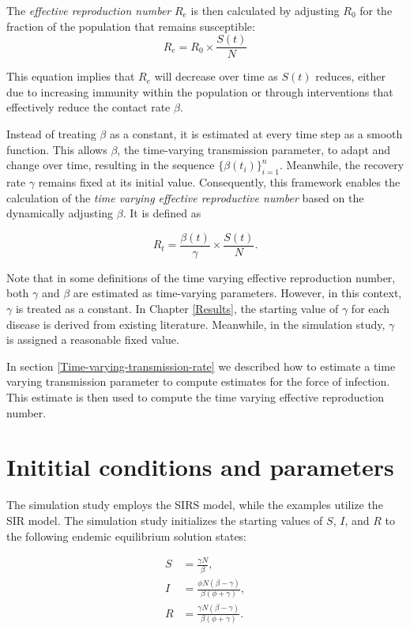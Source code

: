 \documentclass[
11pt, %
oneside, %
english, %
singlespacing, %
]{macthesis} %
\begin{document}
The \emph{effective reproduction number} \(R_e\) is then calculated by adjusting \(R_0\) for the fraction of the population that remains susceptible:
\[
R_e = R_0 \times \frac{S(t)}{N}
\]

This equation implies that \(R_e\) will decrease over time as \(S(t)\) reduces, either due to increasing immunity within the population or through interventions that effectively reduce the contact rate \(\beta\).

Instead of treating \(\beta\) as a constant, it is estimated at every time step as a smooth function. This allows \(\beta\), the time-varying transmission parameter, to adapt and change over time, resulting in the sequence \(\{\beta(t_i)\}_{i=1}^n\). Meanwhile, the recovery rate \(\gamma\) remains fixed at its initial value. Consequently, this framework enables the calculation of the \emph{time varying effective reproductive number} based on the dynamically adjusting \(\beta\). It is defined as

\[
     R_t = \frac{\beta(t)}{\gamma} \times \frac{S(t)}{N}.
 \]

Note that in some definitions of the time varying effective reproduction number, both \(\gamma\) and \(\beta\) are estimated as time-varying parameters. However, in this context, \(\gamma\) is treated as a constant. In Chapter \ref{Results}, the starting value of \(\gamma\) for each disease is derived from existing literature. Meanwhile, in the simulation study, \(\gamma\) is assigned a reasonable fixed value.

In section \ref{Time-varying-transmission-rate} we described how to estimate a time varying transmission parameter to compute estimates for the force of infection. This estimate is then used to compute the time varying effective reproduction number.

\section{Inititial conditions and parameters}\label{Initial-conditions-and-parameters}

The simulation study employs the SIRS model, while the examples utilize the SIR model. The simulation study initializes the starting values of \(S\), \(I\), and \(R\) to the following endemic equilibrium solution states:

\[
\begin{aligned}
S &= \frac{\gamma N}{\beta}, \\
I &= \frac{\phi N (\beta - \gamma)}{\beta(\phi + \gamma)}, \\
R &= \frac{\gamma N (\beta - \gamma)}{\beta (\phi + \gamma)}.
\end{aligned}
\]
\end{document}
